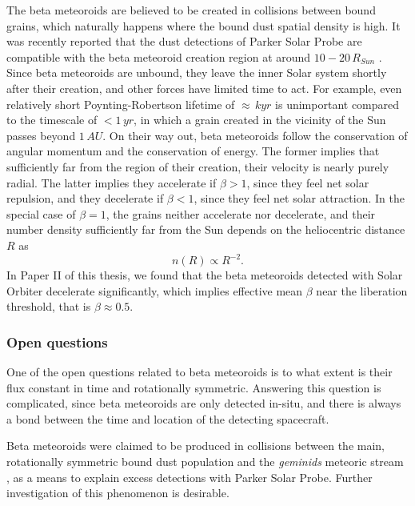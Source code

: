 The beta meteoroids are believed to be created in collisions between bound grains, which naturally happens where the bound dust spatial density is high. It was recently reported that the dust detections of Parker Solar Probe are compatible with the beta meteoroid creation region at around $10 - 20 \, R_{Sun}$ \citep{szalay2021collisional}. Since beta meteoroids are unbound, they leave the inner Solar system shortly after their creation, and other forces have limited time to act. For example, even relatively short Poynting-Robertson lifetime of $\approx \, kyr$ is unimportant compared to the timescale of $< 1 \, \si{yr}$, in which a grain created in the vicinity of the Sun passes beyond $1 \, \si{AU}$. On their way out, beta meteoroids follow the conservation of angular momentum and the conservation of energy. The former implies that sufficiently far from the region of their creation, their velocity is nearly purely radial. The latter implies they accelerate if $\beta > 1$, since they feel net solar repulsion, and they decelerate if $\beta < 1$, since they feel net solar attraction. In the special case of $\beta=1$, the grains neither accelerate nor decelerate, and their number density sufficiently far from the Sun depends on the heliocentric distance $R$ as
\begin{equation}
    n(R) \propto R^{-2}. \label{eq:beta_number_density}
\end{equation}
In Paper II of this thesis, we found that the beta meteoroids detected with Solar Orbiter decelerate significantly, which implies effective mean $\beta$ near the liberation threshold, that is $\beta \approx 0.5$. 

\subsubsection{Open questions}

One of the open questions related to beta meteoroids is to what extent is their flux constant in time and rotationally symmetric. Answering this question is complicated, since beta meteoroids are only detected in-situ, and there is always a bond between the time and location of the detecting spacecraft. 

Beta meteoroids were claimed to be produced in collisions between the main, rotationally symmetric bound dust population and the \textit{geminids} meteoric stream \citep{szalay2021collisional}, as a means to explain excess detections with Parker Solar Probe. Further investigation of this phenomenon is desirable.

